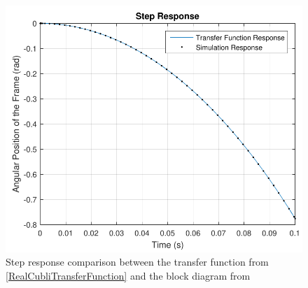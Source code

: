 \begin{figure}[H] 
	\centering 
	\includegraphics[scale=0.55]{figures/stepComparison}
	\caption{Step response comparison between the transfer function from \eqref{RealCubliTransferFunction} and the block diagram from }
	\label{stepComparison}
\end{figure}